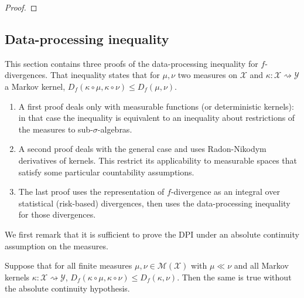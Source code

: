\begin{proof}%
{}

\end{proof}




\subsection{Data-processing inequality}

This section contains three proofs of the data-processing inequality for $f$-divergences.
That inequality states that for $\mu, \nu$ two measures on $\mathcal X$ and $\kappa : \mathcal X \rightsquigarrow \mathcal Y$ a Markov kernel, $D_f(\kappa \circ \mu, \kappa \circ \nu) \le D_f(\mu, \nu)$.
\begin{enumerate}
  \item A first proof deals only with measurable functions (or deterministic kernels): in that case the inequality is equivalent to an inequality about restrictions of the measures to sub-$\sigma$-algebras.
  \item A second proof deals with the general case and uses Radon-Nikodym derivatives of kernels. This restrict its applicability to measurable spaces that satisfy some particular countability assumptions.
  \item The last proof uses the representation of $f$-divergence as an integral over statistical (risk-based) divergences, then uses the data-processing inequality for those divergences.
\end{enumerate}

We first remark that it is sufficient to prove the DPI under an absolute continuity assumption on the measures. 

\begin{lemma}
  \label{lem:DPI_of_DPI_ac}
  Suppose that for all finite measures $\mu, \nu \in \mathcal M(\mathcal X)$ with $\mu \ll \nu$ and all Markov kernels $\kappa : \mathcal X \rightsquigarrow \mathcal Y$, $D_f(\kappa \circ \mu, \kappa \circ \nu) \le D_f(\kappa, \nu)$.
  Then the same is true without the absolute continuity hypothesis.
\end{lemma}

